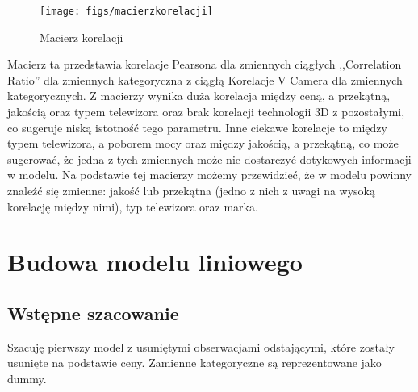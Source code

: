 \documentclass[11pt,a4paper]{article}
\begin{document}
		\begin{figure}[h]
			\centering
			\texttt{[image: figs/macierzkorelacji]}
			\caption[macierz]{Macierz korelacji}
			\label{fig:macierzkorelacji}
		\end{figure}
			\FloatBarrier
		\newpage
		Macierz ta przedstawia korelacje Pearsona dla zmiennych ciągłych
 		,,Correlation Ratio'' dla zmiennych kategoryczna z ciągłą
 		Korelacje V Camera dla zmiennych kategorycznych. 
		Z macierzy wynika duża korelacja między ceną, a przekątną, jakością oraz typem telewizora oraz brak korelacji technologii 3D z pozostałymi, co sugeruje niską istotność tego parametru.
		Inne ciekawe korelacje to między typem telewizora, a poborem mocy oraz między jakością, a przekątną, co może sugerować, że jedna z tych zmiennych może nie dostarczyć dotykowych informacji w modelu. Na podstawie tej macierzy możemy przewidzieć, że w modelu powinny znaleźć się zmienne: jakość lub przekątna (jedno z nich z uwagi na wysoką korelację między nimi), typ telewizora oraz marka.
		\newpage
		

\section{Budowa modelu liniowego}

	
	\subsection{Wstępne szacowanie}
		Szacuję pierwszy model z usuniętymi obserwacjami odstającymi, które zostały usunięte na podstawie ceny. 
		Zamienne kategoryczne są reprezentowane jako dummy.
	
\end{document}
